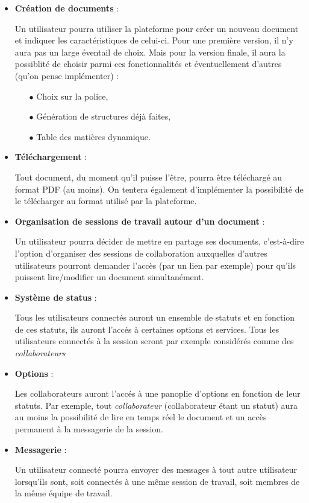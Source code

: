 	\begin{itemize}
		\item \textbf{Création de documents} : \par Un utilisateur pourra utiliser la plateforme pour créer un nouveau document et indiquer les caractéristiques de celui-ci. Pour une première version, il n'y aura pas un large éventail de choix. Mais pour la version finale, il aura la possiblité de choisir parmi ces fonctionnalités et éventuellement d'autres (qu'on pense implémenter) : \par 
		\begin{itemize}
			\item[$\bullet$] Choix sur la police,
			\item[$\bullet$] Génération de structures déjà faites,
			\item[$\bullet$] Table des matières dynamique.
		\end{itemize}
		
		\item \textbf{Téléchargement} : \par Tout document, du moment qu'il puisse l'être, pourra être téléchargé au format PDF (au moins). On tentera également d'implémenter la possibilité de le télécharger au format utilisé par la plateforme.
		
		\item \textbf{Organisation de sessions de travail autour d'un document} : \par Un utilisateur pourra décider de mettre en partage ses documents, c'est-à-dire l'option d'organiser des sessions de collaboration auxquelles d'autres utilisateurs pourront demander l'accès (par un lien par exemple) pour qu'ils puissent lire/modifier un document simultanément.
		
		\item \textbf{Système de status} : \par Tous les utilisateurs connectés auront un ensemble de statuts et en fonction de ces statuts, ils auront l'accés à certaines options et services. Tous les utilisateurs connectés à la session seront par exemple considérés comme des \emph{collaborateurs}
		
		\item \textbf{Options} : \par 
		Les collaborateurs auront l'accés à une panoplie d'options en fonction de leur statuts. Par exemple, tout \emph{collaborateur} (collaborateur étant un statut) aura au moins la possibilité de lire en temps réel le document et un accès permanent à la messagerie de la session.
		
		\item \textbf{Messagerie} : \par 
		Un utilisateur connecté pourra envoyer des messages à tout autre utilisateur lorsqu'ils sont, soit connectés à une même session de travail, soit membres de la même équipe de travail. 
		
	\end{itemize}
	
